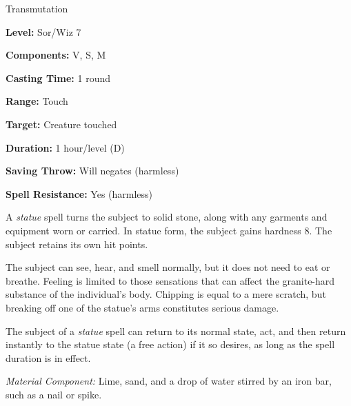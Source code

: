 
Transmutation

\textbf{Level:} Sor/Wiz 7

\textbf{Components:} V, S, M

\textbf{Casting Time:} 1 round

\textbf{Range:} Touch

\textbf{Target:} Creature touched

\textbf{Duration:} 1 hour/level (D)

\textbf{Saving Throw:} Will negates (harmless)

\textbf{Spell Resistance:} Yes (harmless)

A \textit{statue} spell turns the subject to solid stone, along with any garments 
and equipment worn or carried. In statue form, the subject gains hardness 8. The 
subject retains its own hit points.

The subject can see, hear, and smell normally, but it does not need to eat or breathe. 
Feeling is limited to those sensations that can affect the granite-hard substance 
of the individual's body. Chipping is equal to a mere scratch, but breaking off 
one of the statue's arms constitutes serious damage.

The subject of a \textit{statue} spell can return to its normal state, act, and 
then return instantly to the statue state (a free action) if it so desires, as 
long as the spell duration is in effect.

\textit{Material Component:} Lime, sand, and a drop of water stirred by an iron 
bar, such as a nail or spike.


